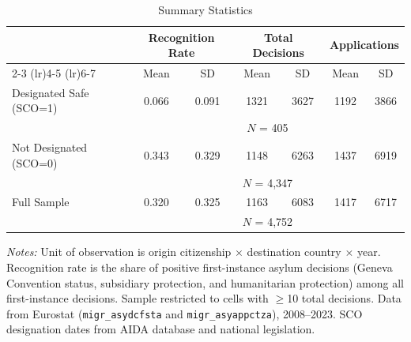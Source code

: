 \begin{table}[H]
\centering
\caption{Summary Statistics}
\begin{threeparttable}
\begin{tabular}{lcccccc}
\toprule
 & \multicolumn{2}{c}{Recognition Rate} & \multicolumn{2}{c}{Total Decisions} & \multicolumn{2}{c}{Applications} \\
\cmidrule(lr){2-3} \cmidrule(lr){4-5} \cmidrule(lr){6-7}
 & Mean & SD & Mean & SD & Mean & SD \\
\midrule
Designated Safe (SCO=1) & 0.066 & 0.091 & 1321 & 3627 & 1192 & 3866 \\
 & \multicolumn{6}{c}{\footnotesize $N$ = 405} \\[0.3em]
Not Designated (SCO=0) & 0.343 & 0.329 & 1148 & 6263 & 1437 & 6919 \\
 & \multicolumn{6}{c}{\footnotesize $N$ = 4,347} \\[0.3em]
\midrule
Full Sample & 0.320 & 0.325 & 1163 & 6083 & 1417 & 6717 \\
 & \multicolumn{6}{c}{\footnotesize $N$ = 4,752} \\
\bottomrule
\end{tabular}
\begin{tablenotes}[flushleft]
\small
\item \textit{Notes:} Unit of observation is origin citizenship $\times$ destination country $\times$ year. Recognition rate is the share of positive first-instance asylum decisions (Geneva Convention status, subsidiary protection, and humanitarian protection) among all first-instance decisions. Sample restricted to cells with $\geq$10 total decisions. Data from Eurostat (\texttt{migr\_asydcfsta} and \texttt{migr\_asyappctza}), 2008--2023. SCO designation dates from AIDA database and national legislation.
\end{tablenotes}
\end{threeparttable}
\label{tab:summary}
\end{table}
